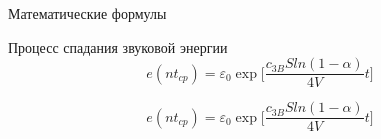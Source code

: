 \begin{frame}[fragile]{Математические формулы}
  \begin{flushleft}
    \Large
    Процесс спадания звуковой энергии
    \begin{equation*}
      e(nt_{cp}) = \varepsilon_0 \exp\Bigg[ \frac{c_{3B} S ln(1 -
        \alpha)}{4V}t \Bigg]
    \end{equation*}
  \end{flushleft}
  \begin{latexcode}
    \begin{equation*}
      e(nt_{cp}) = \varepsilon_0 \exp
      \Bigg[
      \frac{c_{3B} S ln(1 - \alpha)}{4V}t
      \Bigg]
    \end{equation*}
  \end{latexcode}
\end{frame}
